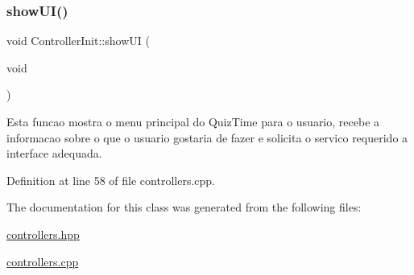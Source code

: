 \subsubsection{\texorpdfstring{show\+U\+I()}{showUI()}}
{\footnotesize\ttfamily void Controller\+Init\+::show\+UI (\begin{DoxyParamCaption}\item[{void}]{ }\end{DoxyParamCaption})}

Esta funcao mostra o menu principal do Quiz\+Time para o usuario, recebe a informacao sobre o que o usuario gostaria de fazer e solicita o servico requerido a interface adequada. 

Definition at line 58 of file controllers.\+cpp.



The documentation for this class was generated from the following files\+:\begin{DoxyCompactItemize}
\item 
\hyperlink{controllers_8hpp}{controllers.\+hpp}\item 
\hyperlink{controllers_8cpp}{controllers.\+cpp}\end{DoxyCompactItemize}
